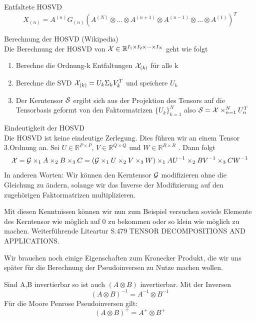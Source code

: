 \begin{Bemerkung} Entfaltete HOSVD \\
\begin{equation}
X_{(n)} = A^{(n)} G_{(n)} ( A^{(N)} \otimes \dots \otimes A^{(n+1)} \otimes A^{(n-1)} \otimes \dots \otimes A^{(1)} )^{T}
\end{equation}
\end{Bemerkung}


\begin{Bemerkung} Berechnung der HOSVD (Wikipedia) \\
Die Berechnung der HOSVD von ${\cal X}  \in \mathbb{R}^{I_1 \times I_2 \times \dots \times I_N}$ geht wie folgt
\begin{enumerate}
\item Berechne die Ordnung-k Entfaltungen ${\cal X}_{(k)}$ für alle k
\item Berechne die SVD ${\cal X}_{(k)}=U_k \Sigma_k V_k^T$ und speichere $U_k$
\item Der Kerntensor ${\cal S}$ ergibt sich aus der Projektion des Tensors auf die Tensorbasis geformt von den Faktormatrizen  $\{ U_k\}_{k=1}^{N}$  also ${\cal S}={\cal X} \times_{n=1}^{N} U_n^T$
\end{enumerate}
\end{Bemerkung}

\begin{Bemerkung} Eindeutigkeit der HOSVD \\
Die HOSVD ist keine eindeutige Zerlegung. Dies führen wir an einem Tensor 3.Ordnung an. Sei $U \in \mathbb{R}^{P \times P}$, $V \in \mathbb{R}^{Q \times Q}$  und $W \in \mathbb{R}^{R \times R}$ . Dann folgt
\begin{equation}
{\cal X} = {\cal G} \times_1 A \times_2 B \times_3 C = ({\cal G} \times_1 U \times_2 V \times_3 W) \times_1 AU^{-1} \times_2 BV^{-1} \times_3 CW^{-1}
\end{equation}
In anderen Worten: Wir können den Kerntensor ${\cal G}$ modifizieren ohne die Gleichung zu ändern, solange wir das Inverse der Modifizierung auf den zugehörigen Faktormatrizen multiplizieren.
\end{Bemerkung}

Mit diesen Kenntnissen können wir nun zum Beispiel versuchen soviele Elemente des Kerntensor wie möglich auf 0 zu bekommen oder so klein wie möglich zu machen.
Weiterführende Liteartur S.479 TENSOR DECOMPOSITIONS AND APPLICATIONS.

Wir brauchen noch einige Eigenschaften zum Kronecker Produkt, die wir uns später für die Berechnung der Pseudoinversen zu Nutze machen wollen.

\begin{Lemma}
Sind A,B invertierbar so ist auch $(A \otimes B)$ invertierbar. Mit der Inversen
\begin{equation*}
(A \otimes B)^{-1} = A^{-1} \otimes B^{-1}
\end{equation*}
Für die Moore Penrose Pseudoinversen gilt:
\begin{equation*}
(A \otimes B)^{+} = A^{+} \otimes B^{+}
\end{equation*}
\end{Lemma}

